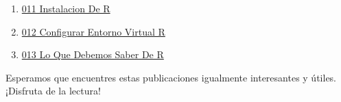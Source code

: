 \documentclass[
  man,
  floatsintext,
  longtable,
  a4paper,
  nolmodern,
  notxfonts,
  notimes,
  12pt,
  colorlinks=true,linkcolor=blue,citecolor=blue,urlcolor=blue]{apa7}
\providecommand{\tightlist}{%
  \setlength{\itemsep}{0pt}\setlength{\parskip}{0pt}}
\begin{document}
\begin{enumerate}
\def\labelenumi{\arabic{enumi}.}
\tightlist
\item
  \href{https://numerus-scriptum.netlify.app/r/2020-06-10-011-instalacion-de-r/index.pdf}{}
  \href{https://numerus-scriptum.netlify.app/r/2020-06-10-011-instalacion-de-r}{011
  Instalacion De R}
\item
  \href{https://numerus-scriptum.netlify.app/r/2020-06-10-012-configurar-entorno-virtual-r/index.pdf}{}
  \href{https://numerus-scriptum.netlify.app/r/2020-06-10-012-configurar-entorno-virtual-r}{012
  Configurar Entorno Virtual R}
\item
  \href{https://numerus-scriptum.netlify.app/r/2020-06-10-013-lo-que-debemos-saber-de-r/index.pdf}{}
  \href{https://numerus-scriptum.netlify.app/r/2020-06-10-013-lo-que-debemos-saber-de-r}{013
  Lo Que Debemos Saber De R}
\end{enumerate}

Esperamos que encuentres estas publicaciones igualmente interesantes y
útiles. ¡Disfruta de la lectura!
\end{document}
